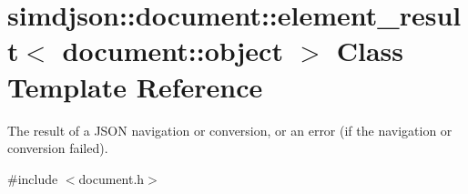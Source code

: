 \hypertarget{classsimdjson_1_1document_1_1element__result_3_01document_1_1object_01_4}{}\section{simdjson\+:\+:document\+:\+:element\+\_\+result$<$ document\+:\+:object $>$ Class Template Reference}
\label{classsimdjson_1_1document_1_1element__result_3_01document_1_1object_01_4}


The result of a J\+S\+ON navigation or conversion, or an error (if the navigation or conversion failed).  




{\ttfamily \#include $<$document.\+h$>$}

